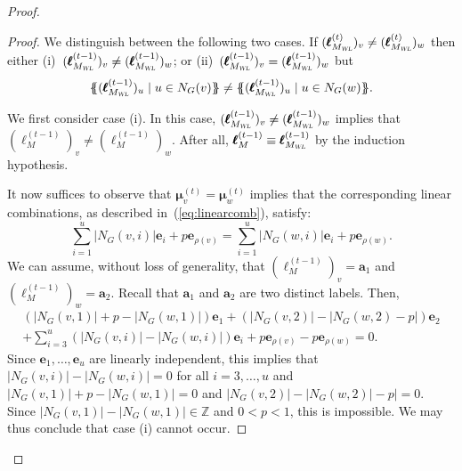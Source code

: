 \begin{proof}
\begin{proof}
We distinguish between the following two cases. If $ (\pmb{\ell}_{M_{\textsl{WL}}}^{(t)})_v\neq(\pmb{\ell}_{M_{\textsl{WL}}}^{(t)})_w$ then either
(i)~$(\pmb{\ell}_{M_{\textsl{WL}}}^{(t-1)})_v\neq(\pmb{\ell}_{M_{\textsl{WL}}}^{(t-1)})_w$; or 
(ii)~$(\pmb{\ell}_{M_{\textsl{WL}}}^{(t-1)})_v=(\pmb{\ell}_{M_{\textsl{WL}}}^{(t-1)})_w$
but
	$$
	\ldbl (\pmb{\ell}_{M_{\textsl{WL}}}^{(t-1)})_u \st u \in N_G(v) \rdbl\neq
	\ldbl(\pmb{\ell}_{M_{\textsl{WL}}}^{(t-1)})_u \st u \in N_G(w) \rdbl.
	$$
%

We first consider case (i). In this case, $(\pmb{\ell}_{M_{\textsl{WL}}}^{(t-1)})_v\neq(\pmb{\ell}_{M_{\textsl{WL}}}^{(t-1)})_w$ implies that
	$(\pmb{\ell}^{(t-1)}_M)_{v}\neq (\pmb{\ell}_M^{(t-1)})_w$. After all,
	$\pmb{\ell}^{(t-1)}_M\equiv \pmb{\ell}_{M_{\textsl{WL}}}^{(t-1)}$ by the induction hypothesis. 
	
It now suffices to observe that $\pmb{\mu}^{(t)}_{v}=\pmb{\mu}^{(t)}_{w}$ implies that
the corresponding linear combinations, as described in~(\ref{eq:linearcomb}), satisfy:
$$
\sum_{i=1}^u |N_G(v,i)|\mathbf{e}_i + p\mathbf{e}_{\rho(v)}=
\sum_{i=1}^u |N_G(w,i)|\mathbf{e}_i + p\mathbf{e}_{\rho(w)}.
$$
We can assume, without loss of generality,  that $(\pmb{\ell}^{(t-1)}_M)_{v}=\mathbf{a}_1$ and
	$(\pmb{\ell}^{(t-1)}_M)_{w}=\mathbf{a}_2$. Recall that $\mathbf{a}_1$ and $\mathbf{a}_2$ are two distinct labels.
Then,
\begin{multline*}
\left(|N_G(v,1)|+p-|N_G(w,1)|\right)\mathbf{e}_1+
\left(|N_G(v,2)|-|N_G(w,2)-p|\right)\mathbf{e}_2{}\\+
\sum_{i=3}^u \left(|N_G(v,i)|-|N_G(w,i)|\right)\mathbf{e}_i+ p\mathbf{e}_{\rho(v)}  - p \mathbf{e}_{\rho(w)}=0.
\end{multline*}
Since $\mathbf{e}_1,\ldots,\mathbf{e}_u$ are linearly independent, this implies that $|N_G(v,i)|-|N_G(w,i)|=0$
for all $i=3,\ldots,u$ and $|N_G(v,1)|+p-|N_G(w,1)|=0$
and $|N_G(v,2)|-|N_G(w,2)|-p|=0$. Since $|N_G(v,1)|-|N_G(w,1)|\in\mathbb{Z}$ and $0<p<1$, this is impossible. We may thus conclude that case (i) cannot occur.
	


\end{proof}
\end{proof}
